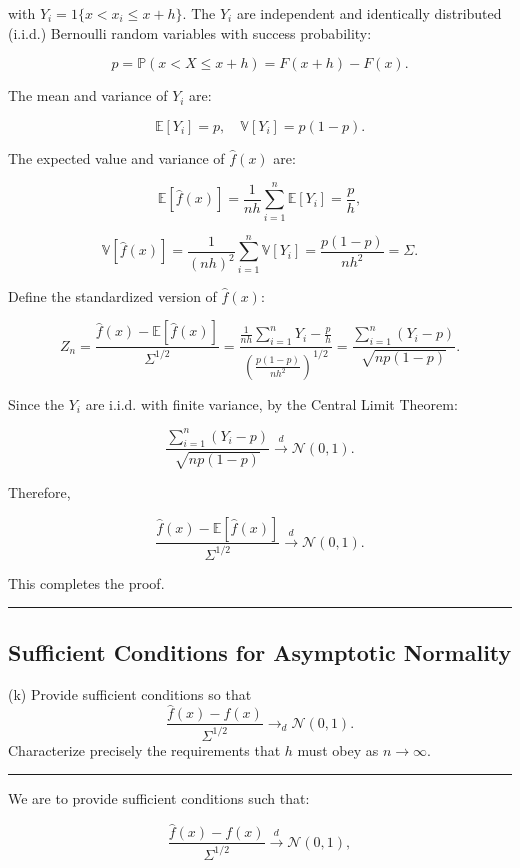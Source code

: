 \documentclass{article}
\newenvironment{colorparagraph}[1]{\par\color{#1}}{\par}
\begin{document}
with \( Y_i = 1\{ x < x_i \leq x + h \} \). The \( Y_i \) are independent and identically distributed (i.i.d.) Bernoulli random variables with success probability:

\[
p = \mathbb{P}(x < X \leq x + h) = F(x + h) - F(x).
\]

The mean and variance of \( Y_i \) are:

\[
\mathbb{E}[Y_i] = p, \quad \mathbb{V}[Y_i] = p (1 - p).
\]

The expected value and variance of \( \hat{f}(x) \) are:

\[
\mathbb{E}[\hat{f}(x)] = \frac{1}{n h} \sum_{i=1}^n \mathbb{E}[Y_i] = \frac{p}{h},
\]

\[
\mathbb{V}[\hat{f}(x)] = \frac{1}{(n h)^2} \sum_{i=1}^n \mathbb{V}[Y_i] = \frac{p (1 - p)}{n h^2} = \Sigma.
\]

Define the standardized version of \( \hat{f}(x) \):

\[
Z_n = \frac{\hat{f}(x) - \mathbb{E}[\hat{f}(x)]}{\Sigma^{1/2}} = \frac{\frac{1}{n h} \sum_{i=1}^n Y_i - \frac{p}{h}}{\left( \frac{p (1 - p)}{n h^2} \right)^{1/2}} = \frac{\sum_{i=1}^n (Y_i - p)}{\sqrt{n p (1 - p)}}.
\]

Since the \( Y_i \) are i.i.d. with finite variance, by the Central Limit Theorem:

\[
\frac{\sum_{i=1}^n (Y_i - p)}{\sqrt{n p (1 - p)}} \xrightarrow{d} \mathcal{N}(0, 1).
\]

Therefore,

\[
\frac{\hat{f}(x) - \mathbb{E}[\hat{f}(x)]}{\Sigma^{1/2}} \xrightarrow{d} \mathcal{N}(0, 1).
\]

This completes the proof.

\begin{colorparagraph}{questioncolor}
\label{q2k}
\rule{\textwidth}{0.5pt}
\subsection{Sufficient Conditions for Asymptotic Normality}
(k) Provide sufficient conditions so that
\[
\frac{\hat{f}(x) - f(x)}{\Sigma^{1/2}} \to_d \mathcal{N}(0, 1).
\]
Characterize precisely the requirements that \( h \) must obey as \( n \to \infty \).

\rule{\textwidth}{0.5pt}
\end{colorparagraph}

We are to provide sufficient conditions such that:

\[
\frac{\hat{f}(x) - f(x)}{\Sigma^{1/2}} \xrightarrow{d} \mathcal{N}(0, 1),
\]
\end{document}
